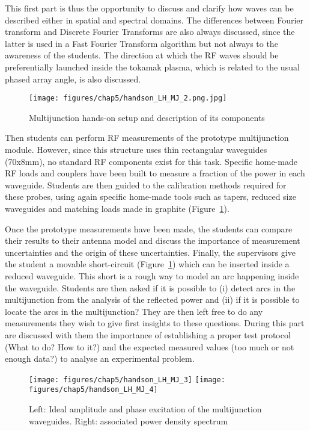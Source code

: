 This first part is thus the opportunity to discuss and clarify how waves can be described either in spatial and spectral domains. The differences between Fourier transform and Discrete Fourier Transforms are also always discussed, since the latter is used in a Fast Fourier Transform algorithm but not always to the awareness of the students. The direction at which the RF waves should be preferentially launched inside the tokamak plasma, which is related to the usual phased array angle, is also discussed.

\begin{figure}
	\centering
	\texttt{[image: figures/chap5/handson\_LH\_MJ\_2.png.jpg]}
	\caption{Multijunction hands-on setup and description of its components}
	\label{fig:handsonlhmj2}
\end{figure}

Then students can perform RF measurements of the prototype multijunction module. However, since this structure uses thin rectangular waveguides (70x8mm), no standard RF components exist for this task. Specific home-made RF loads and couplers have been built to measure a fraction of the power in each waveguide. Students are then guided to the calibration methods required for these probes, using again specific home-made tools such as tapers, reduced size waveguides and matching loads made in graphite (Figure~\ref{fig:handsonlhmj2}).

Once the prototype measurements have been made, the students can compare their results to their antenna model and discuss the importance of measurement uncertainties and the origin of these uncertainties. Finally, the supervisors give the student a movable short-circuit (Figure~\ref{fig:handsonlhmj2}) which can be inserted inside a reduced waveguide. This short is a rough way to model an arc happening inside the waveguide. Students are then asked if it is possible to (i) detect arcs in the multijunction from the analysis of the reflected power and (ii) if it is possible to locate the arcs in the multijunction? They are then left free to do any measurements they wish to give first insights to these questions. During this part are discussed with them the importance of establishing a proper test protocol (What to do? How to it?) and the expected measured values (too much or not enough data?) to analyse an experimental problem.


\begin{figure*}
	\centering
	\texttt{[image: figures/chap5/handson\_LH\_MJ\_3]}
	\texttt{[image: figures/chap5/handson\_LH\_MJ\_4]}
	\caption{Left: Ideal amplitude and phase excitation of the multijunction waveguides. Right: associated power density spectrum}
	\label{fig:handsonlhmj3}
\end{figure*}

